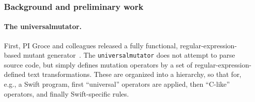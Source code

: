 \subsubsection{Background and preliminary work}




\paragraph{The universalmutator.} First, PI Groce and colleagues
released a fully functional, regular-expression-based mutant
generator~\cite{regexpMut,universalmutator}.
The {\tt universalmutator}
does not attempt to parse source code, but simply defines mutation
operators by a set of regular-expression-defined text transformations.  These
are organized into a hierarchy, so that for, e.g., a Swift program,
first ``universal'' operators are applied, then ``C-like'' operators,
and finally Swift-specific rules.

